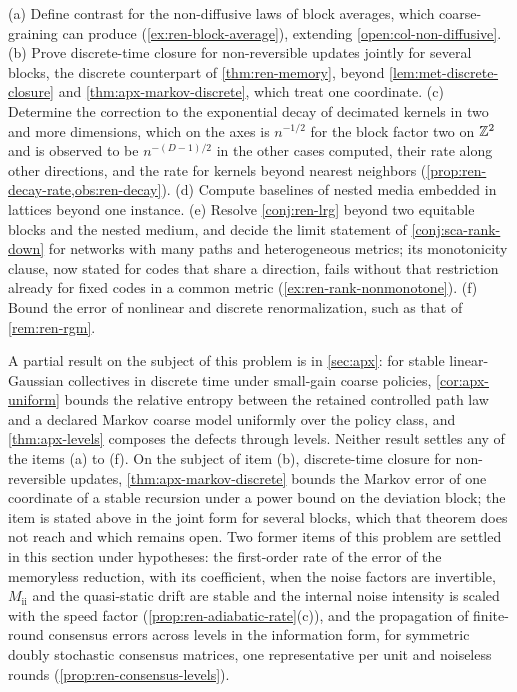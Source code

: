 \begin{openproblem}\label{open:ren-beyond}
(a) Define contrast for the non-diffusive laws of block averages, which coarse-graining can produce (\cref{ex:ren-block-average}), extending \cref{open:col-non-diffusive}. (b) Prove discrete-time closure for non-reversible updates jointly for several blocks, the discrete counterpart of \cref{thm:ren-memory}, beyond \cref{lem:met-discrete-closure} and \cref{thm:apx-markov-discrete}, which treat one coordinate. (c) Determine the correction to the exponential decay of decimated kernels in two and more dimensions, which on the axes is $n^{-1/2}$ for the block factor two on $\mathbb{Z}^2$ and is observed to be $n^{-(D-1)/2}$ in the other cases computed, their rate along other directions, and the rate for kernels beyond nearest neighbors (\cref{prop:ren-decay-rate,obs:ren-decay}). (d) Compute baselines of nested media embedded in lattices beyond one instance. (e) Resolve \cref{conj:ren-lrg} beyond two equitable blocks and the nested medium, and decide the limit statement of \cref{conj:sca-rank-down} for networks with many paths and heterogeneous metrics; its monotonicity clause, now stated for codes that share a direction, fails without that restriction already for fixed codes in a common metric (\cref{ex:ren-rank-nonmonotone}). (f) Bound the error of nonlinear and discrete renormalization, such as that of \cref{rem:ren-rgm}.
\end{openproblem}
A partial result on the subject of this problem is in \cref{sec:apx}: for stable linear-Gaussian collectives in discrete time under small-gain coarse policies, \cref{cor:apx-uniform} bounds the relative entropy between the retained controlled path law and a declared Markov coarse model uniformly over the policy class, and \cref{thm:apx-levels} composes the defects through levels. Neither result settles any of the items (a) to (f). On the subject of item (b), discrete-time closure for non-reversible updates, \cref{thm:apx-markov-discrete} bounds the Markov error of one coordinate of a stable recursion under a power bound on the deviation block; the item is stated above in the joint form for several blocks, which that theorem does not reach and which remains open. Two former items of this problem are settled in this section under hypotheses: the first-order rate of the error of the memoryless reduction, with its coefficient, when the noise factors are invertible, $M_{\mathrm{ii}}$ and the quasi-static drift are stable and the internal noise intensity is scaled with the speed factor (\cref{prop:ren-adiabatic-rate}(c)), and the propagation of finite-round consensus errors across levels in the information form, for symmetric doubly stochastic consensus matrices, one representative per unit and noiseless rounds (\cref{prop:ren-consensus-levels}).
